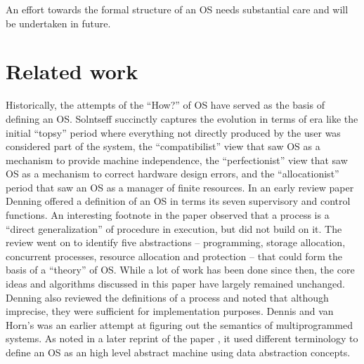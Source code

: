 \documentclass[draft]{article}
\begin{document}
An effort towards the formal structure of an OS needs substantial care
and will be undertaken in future.

\section{Related work}
\label{sec:lit:review}

Historically, the attempts  of the ``How?''  of OS  have served as the
basis        of        defining        an        OS.         Solntseff
\cite{Solntseff:1981:SOS:1164685.1164689}   succinctly   captures  the
evolution  in terms  of era  like the  initial ``topsy''  period where
everything not  directly produced by  the user was considered  part of
the system, the  ``compatibilist'' view that saw OS  as a mechanism to
provide machine  independence, the ``perfectionist'' view  that saw OS
as   a  mechanism  to   correct  hardware   design  errors,   and  the
``allocationist''  period  that saw  an  OS  as  a manager  of  finite
resources.      In      an     early     review      paper     Denning
\cite{Denning:1971:TGC:356593.356595} offered a definition of an OS in
terms  its seven  supervisory and  control functions.   An interesting
footnote  in  the  paper  observed   that  a  process  is  a  ``direct
generalization'' of procedure  in execution, but did not  build on it.
The  review went  on  to identify  five  abstractions --  programming,
storage  allocation,  concurrent  processes, resource  allocation  and
protection -- that could form the  basis of a ``theory'' of OS.  While
a lot of work has been  done since then, the core ideas and algorithms
discussed in this paper have largely remained unchanged.  Denning also
reviewed  the  definitions  of  a  process  and  noted  that  although
imprecise, they  were sufficient for  implementation purposes.  Dennis
and  van Horn's  \cite{Dennis:1966:PSM:365230.365252}  was an  earlier
attempt at figuring out  the semantics of multiprogrammed systems.  As
noted      in      a     later      reprint      of     the      paper
\cite{Dennis:1983:PSM:357980.357993}, it used different terminology to
define an OS as an  high level abstract machine using data abstraction
concepts.
\end{document}
